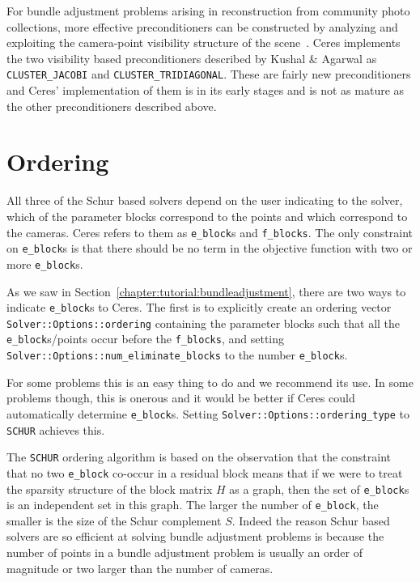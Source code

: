 For bundle adjustment problems arising in reconstruction from community photo collections, more effective preconditioners can be constructed by analyzing and exploiting the camera-point visibility structure of the scene~\cite{kushal2012}. Ceres implements the two visibility based preconditioners described by Kushal \& Agarwal as \texttt{CLUSTER\_JACOBI} and \texttt{CLUSTER\_TRIDIAGONAL}. These are fairly new preconditioners and Ceres' implementation of them is in its early stages and is not as mature as the other preconditioners described above.

\section{Ordering}
All three of the Schur based solvers depend on the user indicating to the solver, which of the parameter blocks correspond to the points and which correspond to the cameras. Ceres refers to them as \texttt{e\_block}s and \texttt{f\_blocks}. The only constraint on \texttt{e\_block}s is that there should be no term in the objective function with two or more \texttt{e\_block}s.

As we saw in Section~\ref{chapter:tutorial:bundleadjustment}, there are two ways to indicate \texttt{e\_block}s to Ceres. The first is to explicitly create an ordering vector \texttt{Solver::Options::ordering} containing the parameter blocks such that all the \texttt{e\_block}s/points occur before the \texttt{f\_blocks}, and setting \texttt{Solver::Options::num\_eliminate\_blocks} to the number \texttt{e\_block}s.

For some problems this is an easy thing to do and we recommend its use. In some problems though, this is onerous and it would be better if Ceres could automatically determine \texttt{e\_block}s. Setting \texttt{Solver::Options::ordering\_type} to \texttt{SCHUR} achieves this.

The \texttt{SCHUR} ordering algorithm is based on the observation that
the constraint that no two \texttt{e\_block} co-occur in a residual
block means that if we were to treat the sparsity structure of the
block matrix $H$ as a graph, then the set of \texttt{e\_block}s is an
independent set in this graph. The larger the number of
\texttt{e\_block}, the smaller is the size of the Schur complement $S$. Indeed the reason Schur based solvers are so efficient at solving bundle adjustment problems is because the number of points in a bundle adjustment problem is usually an order of magnitude or two larger than the number of cameras.

